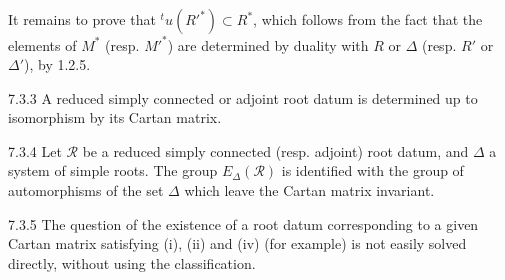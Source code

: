 It remains to prove that ${}^tu(R'^*)\subset R^*$, which follows from the fact that the elements of $M^*$ (resp. $M'^*$) are determined by duality with $R$ or $\Delta$ (resp. $R'$ or $\Delta'$), by 1.2.5.
\begin{corollary}{7.3.3}\label{XXI.7.3.3}
A reduced simply connected or adjoint root datum is determined up to isomorphism by its Cartan matrix.
\end{corollary}
\begin{corollary}{7.3.4}\label{XXI.7.3.4}
Let $\mathcal R$ be a reduced simply connected (resp. adjoint) root datum, and $\Delta$ a system of simple roots. The group $E_\Delta(\mathcal R)$ is identified with the group of automorphisms of the set $\Delta$ which leave the Cartan matrix invariant.
\end{corollary}
\begin{remark}{7.3.5}\label{XXI.7.3.5}
The question of the existence of a root datum corresponding to a given Cartan matrix satisfying (i), (ii) and (iv) (for example) is not easily solved directly, without using the classification.
\end{remark}

